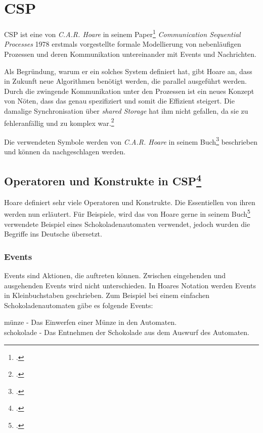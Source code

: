\section{\acl{CSP}}
\acf{CSP} ist eine von \textit{C.A.R. Hoare} in seinem Paper\footcite{CSP} \textit{Communication Sequential Processes} 1978 erstmals vorgestellte formale Modellierung von nebenläufigen Prozessen und deren Kommunikation untereinander mit Events und Nachrichten.

Als Begründung, warum er ein solches System definiert hat, gibt Hoare an, dass in Zukunft neue Algorithmen benötigt werden, die parallel ausgeführt werden. Durch die zwingende Kommunikation unter den Prozessen ist ein neues Konzept von Nöten, dass das genau spezifiziert und somit die  Effizient steigert. Die damalige Synchronisation über \textit{shared Storage} hat ihm nicht gefallen, da sie zu fehleranfällig und zu komplex war.\footcite[Introduction]{CSP}

Die verwendeten Symbole werden von \textit{C.A.R. Hoare} in seinem Buch\footcite[Glossary of Symbols]{CSPBOOK} beschrieben und können da nachgeschlagen werden.
\subsection[Operatoren und Konstrukte in \acs{CSP}]{Operatoren und Konstrukte in \acs{CSP}\footcite[Siehe][Kap. 1.1]{CSPBOOK}}

Hoare definiert sehr viele Operatoren und Konstrukte. Die Essentiellen von ihren werden nun erläutert. Für Beispiele, wird das von Hoare gerne in seinem Buch\footcite{CSPBOOK} verwendete Beispiel eines Schokoladenautomaten verwendet, jedoch wurden die Begriffe ins Deutsche übersetzt.

\subsubsection{Events}
Events sind Aktionen, die auftreten können. Zwischen eingehenden und ausgehenden Events wird nicht unterschieden. In Hoares Notation werden Events in Kleinbuchstaben geschrieben.
Zum Beispiel bei einem einfachen Schokoladenautomaten gäbe es folgende Events:

\begin{addmargin}[1cm]{0cm}
münze - Das Einwerfen einer Münze in den Automaten.\\
schokolade - Das Entnehmen der Schokolade aus dem Auswurf des Automaten.
\end{addmargin}

